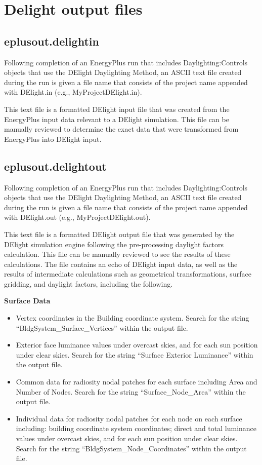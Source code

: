 \section{Delight output files}\label{delight-output-files}

\subsection{eplusout.delightin}\label{eplusout.delightin}

Following completion of an EnergyPlus run that includes Daylighting:Controls objects that use the DElight Daylighting Method, an ASCII text file created during the run is given a file name that consists of the project name appended with DElight.in (e.g., MyProjectDElight.in).

This text file is a formatted DElight input file that was created from the EnergyPlus input data relevant to a DElight simulation. This file can be manually reviewed to determine the exact data that were transformed from EnergyPlus into DElight input.

\subsection{eplusout.delightout}\label{eplusout.delightout}

Following completion of an EnergyPlus run that includes Daylighting:Controls objects that use the DElight Daylighting Method, an ASCII text file created during the run is given a file name that consists of the project name appended with DElight.out (e.g., MyProjectDElight.out).

This text file is a formatted DElight output file that was generated by the DElight simulation engine following the pre-processing daylight factors calculation. This file can be manually reviewed to see the results of these calculations. The file contains an echo of DElight input data, as well as the results of intermediate calculations such as geometrical transformations, surface gridding, and daylight factors, including the following.

\textbf{Surface Data}

\begin{itemize}
\item
  Vertex coordinates in the Building coordinate system. Search for the string ``BldgSystem\_Surface\_Vertices'' within the output file.
\item
  Exterior face luminance values under overcast skies, and for each sun position under clear skies. Search for the string ``Surface Exterior Luminance'' within the output file.
\item
  Common data for radiosity nodal patches for each surface including Area and Number of Nodes. Search for the string ``Surface\_Node\_Area'' within the output file.
\item
  Individual data for radiosity nodal patches for each node on each surface including: building coordinate system coordinates; direct and total luminance values under overcast skies, and for each sun position under clear skies. Search for the string ``BldgSystem\_Node\_Coordinates'' within the output file.
\end{itemize}

